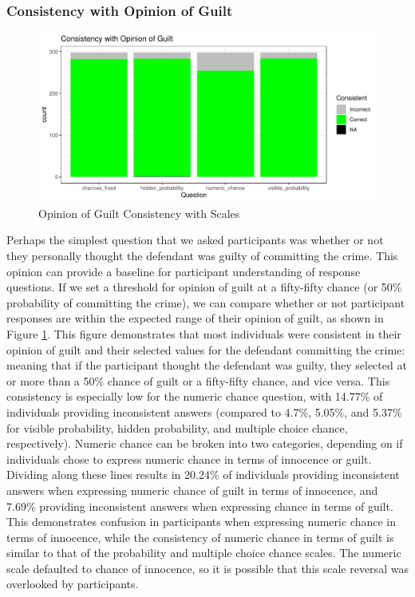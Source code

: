 \documentclass[print]{nuthesis}
\begin{document}
\hypertarget{consistency-with-opinion-of-guilt}{%
\subsubsection{Consistency with Opinion of Guilt}\label{consistency-with-opinion-of-guilt}}

\begin{figure}

{\centering \includegraphics[width=\linewidth]{thesis_files/figure-latex/opinioncomp-1} 

}

\caption{Opinion of Guilt Consistency with Scales}\label{fig:opinioncomp}
\end{figure}

Perhaps the simplest question that we asked participants was whether or not they personally thought the defendant was guilty of committing the crime.
This opinion can provide a baseline for participant understanding of response questions.
If we set a threshold for opinion of guilt at a fifty-fifty chance (or 50\% probability of committing the crime), we can compare whether or not participant responses are within the expected range of their opinion of guilt, as shown in Figure \ref{fig:opinioncomp}.
This figure demonstrates that most individuals were consistent in their opinion of guilt and their selected values for the defendant committing the crime: meaning that if the participant thought the defendant was guilty, they selected at or more than a 50\% chance of guilt or a fifty-fifty chance, and vice versa.
This consistency is especially low for the numeric chance question, with 14.77\% of individuals providing inconsistent answers (compared to 4.7\%, 5.05\%, and 5.37\% for visible probability, hidden probability, and multiple choice chance, respectively).
Numeric chance can be broken into two categories, depending on if individuals chose to express numeric chance in terms of innocence or guilt.
Dividing along these lines results in 20.24\% of individuals providing inconsistent answers when expressing numeric chance of guilt in terms of innocence, and 7.69\% providing inconsistent answers when expressing chance in terms of guilt.
This demonstrates confusion in participants when expressing numeric chance in terms of innocence, while the consistency of numeric chance in terms of guilt is similar to that of the probability and multiple choice chance scales.
The numeric scale defaulted to chance of innocence, so it is possible that this scale reversal was overlooked by participants.
\end{document}
